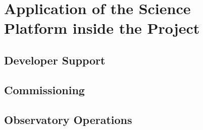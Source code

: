 \section{Application of the Science Platform inside the Project}\label{application-of-the-science-platform-inside-the-project}

\subsection{Developer Support}\label{developer-support}

\subsection{Commissioning}\label{commissioning}

\subsection{Observatory Operations}\label{observatory-operations}

